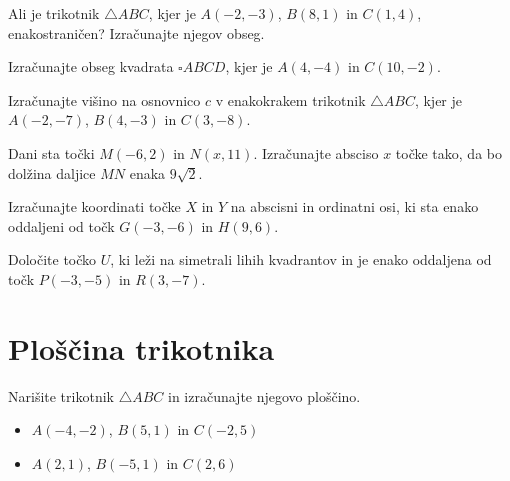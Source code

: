         \begin{naloga}
            Ali je trikotnik $\triangle ABC$, kjer je $A(-2,-3)$, $B(8,1)$ in $C(1,4)$, enakostraničen?
            Izračunajte njegov obseg. 
        \end{naloga}

        \begin{naloga}
            Izračunajte obseg kvadrata $\square ABCD$, kjer je $A(4,-4)$ in $C(10,-2)$. 
        \end{naloga}

        \begin{naloga}
            Izračunajte višino na osnovnico $c$ v enakokrakem trikotnik $\triangle ABC$, kjer je $A(-2,-7)$, $B(4,-3)$ in $C(3,-8)$. 
        \end{naloga}

        \begin{naloga}
            Dani sta točki $M(-6,2)$ in $N(x,11)$. Izračunajte absciso $x$ točke tako, da bo dolžina daljice $MN$ enaka $9\sqrt{2}$. 
        \end{naloga}

        \begin{naloga}
            Izračunajte koordinati točke $X$ in $Y$ na abscisni in ordinatni osi, ki sta enako oddaljeni od točk $G(-3,-6)$ in $H(9,6)$. 
        \end{naloga}

        \begin{naloga}
            Določite točko $U$, ki leži na simetrali lihih kvadrantov in je enako oddaljena od točk $P(-3,-5)$ in $R(3,-7)$. 
        \end{naloga}

    








\newpage

    \section{Ploščina trikotnika}




        \begin{naloga}
            Narišite trikotnik $\triangle ABC$ in izračunajte njegovo ploščino.
            \begin{itemize}
                \item $A(-4,-2)$, $B(5,1)$ in $C(-2,5)$ 
                \item $A(2,1)$, $B(-5,1)$ in $C(2,6)$ 
            \end{itemize}
        \end{naloga}

